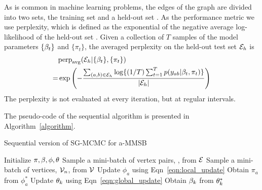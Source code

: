 As is common in machine learning problems, the edges of the graph are divided
into two sets, the training set and a held-out set \Heldout.
As the performance metric we use perplexity, which is defined as the exponential
of the negative average log-likelihood of the held-out set \Heldout. Given a collection of $T$
samples of the model parameters $\{\beta_t\}$ and $\{\pi_t\}$, the averaged
perplexity on the held-out test set $\Heldout$ is 
\begin{align}
&\text{perp}_{\text{avg}}(\Heldout|\{\beta_t\},\{\pi_t\})\nonumber \\=&
\exp\left(-\frac{\sum_{(a,b)\in \Heldout}^{}\log
\{(1/T)\sm{t}{T}p(y_{ab}|\beta_t,\pi_t)\}}{|\cE_{h}|}\right)
\end{align}
The perplexity is not evaluated at every iteration, but at regular intervals.

The pseudo-code of the sequential algorithm is presented in Algorithm~\ref{algorithm}. 

\begin{algorithm}[t]
\caption{Sequential version of SG-MCMC for a-MMSB}\label{alg}
\begin{algorithmic}[1]
\STATE Initialize $\pi , \beta, \phi, \theta$
\STATE Sample a mini-batch of vertex pairs, \Minibatch, from $\cE$
	\STATE Sample a mini-batch of vertices, $\Neighbors$, from $\Vertices$
    \STATE Update $\phi_{a}$ using Eqn~\ref{eqn:local_update}
    \STATE Obtain $\pi_a$ from $\phi_a^*$ \ENDFOR
{}
    \STATE Update $\theta_{k}$ using Eqn~\ref{eqn:global_update}
    \STATE Obtain $\beta_k$ from $\theta_k^*$
\ENDFOR
\ENDWHILE
\end{algorithmic}
\label{algorithm}
\end{algorithm}


